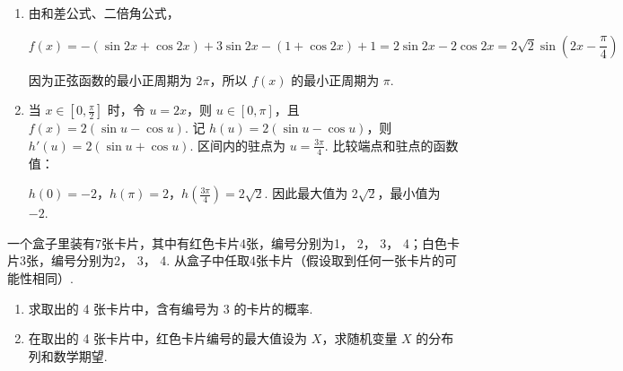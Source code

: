 \begin{solution}
\begin{enumerate}
\item 由和差公式、二倍角公式，

\[
f(x)=-\left(\sin2x+\cos2x\right)+3\sin2x-\left(1+\cos2x\right)+1=2\sin2x-2\cos2x=2\sqrt{2}\sin\left(2x-\frac{\pi}{4}\right)
\]

因为正弦函数的最小正周期为 \(2\pi\)，所以 \(f(x)\) 的最小正周期为 \(\pi\).

\item 当 \(x\in\left[0,\frac{\pi}{2}\right]\) 时，令 \(u=2x\)，则 \(u\in[0,\pi]\)，且 \(f(x)=2(\sin u-\cos u)\). 记 \(h(u)=2(\sin u-\cos u)\)，则 \(h'(u)=2(\sin u+\cos u)\). 区间内的驻点为 \(u=\frac{3\pi}{4}\). 比较端点和驻点的函数值：

\(h(0)=-2\)，\(h(\pi)=2\)，\(h\left(\frac{3\pi}{4}\right)=2\sqrt{2}\). 因此最大值为 \(2\sqrt{2}\)，最小值为 \(-2\).
\end{enumerate}
\end{solution}

\begin{problem}
一个盒子里装有7张卡片，其中有红色卡片4张，编号分别为1， 2， 3， 4；白色卡片3张，编号分别为2， 3， 4. 从盒子中任取4张卡片（假设取到任何一张卡片的可能性相同）.
\begin{enumerate}
\item 求取出的 4 张卡片中，含有编号为 3 的卡片的概率.
\item 在取出的 4 张卡片中，红色卡片编号的最大值设为 \(X\)，求随机变量 \(X\) 的分布列和数学期望.
\end{enumerate}
\end{problem}

